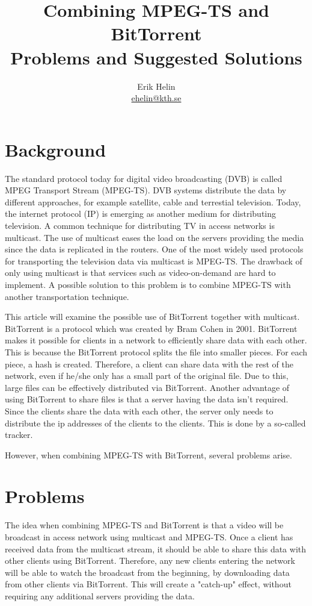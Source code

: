 \documentclass[11pt,oneside,a4paper,onecolumn]{article}
\begin{document}
\title{Combining MPEG-TS and BitTorrent\\
       \large{Problems and Suggested Solutions}}
\author{Erik Helin\\\url{ehelin@kth.se}}
\maketitle

\section{Background}
The standard protocol today for digital 
video broadcasting (DVB) is called 
MPEG Transport Stream (MPEG-TS).
DVB systems distribute the data by different approaches, 
for example satellite, cable and terrestial television\cite{dvb}.
Today, the internet protocol (IP) is emerging as another medium for distributing television. 
A common technique for distributing TV in access networks is multicast.
The use of multicast eases the load on the servers providing the media
since the data is replicated in the routers\cite{multicast}.
One of the most widely used protocols for transporting the television
data via multicast is MPEG-TS.
The drawback of only using multicast is that services such as
video-on-demand are hard to implement. A possible solution to this
problem is to combine MPEG-TS with another transportation technique.

This article will examine the possible use of BitTorrent together with 
multicast. BitTorrent is a protocol which was created by Bram Cohen in
2001\cite{bittorrent}. BitTorrent makes it possible for clients in a
network to efficiently share data with each other. This is because
the BitTorrent protocol splits the file into smaller pieces. For each
piece, a hash is created. Therefore, a client can share data with the
rest of the network, even if he/she only has a small part of the original
file. Due to this, large files can be effectively distributed via
BitTorrent. Another advantage of using BitTorrent to share files is
that a server having the data isn't required. Since the clients share
the data with each other, the server only needs to distribute the ip
addresses of the clients to the clients. This is done by a so-called
tracker.

However, when combining MPEG-TS with BitTorrent, several problems
arise.

\section{Problems}
The idea when combining MPEG-TS and BitTorrent is that a video will be
broadcast in access network using multicast and MPEG-TS. Once a client
has received data from the multicast stream, it should be able to share this
data with other clients using BitTorrent. Therefore, any new clients
entering the network will be able to watch the broadcast from the
beginning, by downloading data from other clients via BitTorrent. This
will create a "catch-up" effect, without requiring any additional
servers providing the data. 
\end{document}
